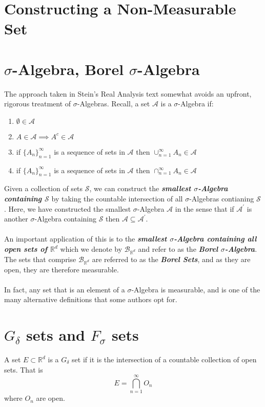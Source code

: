 \section{Constructing a Non-Measurable Set}


\newpage
\section{$\sigma$-Algebra, Borel $\sigma$-Algebra}
The approach taken in Stein's Real Analysis text somewhat avoids an upfront, rigorous treatment of $\sigma$-Algebras. Recall, a set $\mathcal{A}$ is a $\sigma$-Algebra if:\begin{enumerate}
    \item $\emptyset\in\mathcal{A}$
    \item $A\in\mathcal{A} \implies A^c\in\mathcal{A}$
    \item if $\{A_n\}_{n=1}^{\infty}$ is a sequence of sets in $\mathcal{A}$ then $\cup_{n=1}^{\infty}A_n \in \mathcal{A}$
    \item if $\{A_n\}_{n=1}^{\infty}$ is a sequence of sets in $\mathcal{A}$ then $\cap_{n=1}^{\infty}A_n \in \mathcal{A}$
\end{enumerate}
Given a collection of sets $\mathcal{S}$, we can construct the \textit{\textbf{smallest $\sigma$-Algebra containing $\mathcal{S}$}} by taking the countable intersection of all $\sigma$-Algebras contianing $\mathcal{S}$. Here, we have constructed the smallest $\sigma$-Algebra $\mathcal{A}$ in the sense that if $\mathcal{A}^\prime$ is another $\sigma$-Algebra containing $\mathcal{S}$ then $\mathcal{A}\subseteq\mathcal{A}^\prime$. \\
\\
An important application of this is to the \textit{\textbf{smallest $\sigma$-Algebra containing all open sets of $\mathbb{R}^d$}} which we denote by $\mathcal{B}_{\mathbb{R}^d}$ and refer to as the \textbf{\textit{Borel $\sigma$-Algebra}}. The sets that comprise $\mathcal{B}_{\mathbb{R}^d}$ are referred to as the \textit{\textbf{Borel Sets}}, and as they are open, they are therefore measurable. \\
\\
In fact, any set that is an element of a $\sigma$-Algebra is measurable, and is one of the many alternative definitions that some authors opt for. 

\newpage
\section{$G_\delta$ sets and $F_\sigma$ sets}
\begin{definition} A set $E\subset\mathbb{R}^d$ is a $G_\delta$ set if it is the intersection of a countable collection of open sets. That is 
$$E = \bigcap_{n=1}^{\infty}O_n$$
where $O_n$ are open. 
\end{definition}

